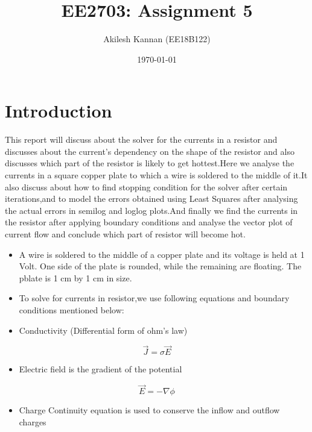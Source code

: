 \documentclass[11pt, a4paper, twoside]{article}
\title{EE2703: Assignment 5}
\author{Akilesh Kannan (EE18B122)}
\date{\today}
\begin{document}
	
	
\maketitle %
  \section{Introduction}
  This report will discuss about the solver for the currents in a
resistor and discusses about the current's dependency on the shape of
the resistor and also discusses which part of the resistor is likely to
get hottest.Here we analyse the currents in a square copper plate to
which a wire is soldered to the middle of it.It also discuss about how
to find stopping condition for the solver after certain iterations,and
to model the errors obtained using Least Squares after analysing the
actual errors in semilog and loglog plots.And finally we find the
currents in the resistor after applying boundary conditions and analyse
the vector plot of current flow and conclude which part of resistor will
become hot.

	\begin{itemize}
    \item
      A wire is soldered to the middle of a copper plate and its voltage is
      held at 1 Volt. One side of the plate is rounded, while the remaining
      are floating. The pblate is 1 cm by 1 cm in size.
    \item
      To solve for currents in resistor,we use following equations and
      boundary conditions mentioned below:
    \item
      Conductivity (Differential form of ohm's law)
    \end{itemize}
    
    \begin{equation}
    \vec{J} = \sigma\vec{E}
       \end{equation}
    
    \begin{itemize}
    \item
      Electric field is the gradient of the potential
    \end{itemize}
    
    \begin{equation}
    \vec{E} = -\nabla{\phi}
       \end{equation}
    
    \begin{itemize}
    \item
      Charge Continuity equation is used to conserve the inflow and outflow
      charges
    \end{itemize}
    
\end{document}
